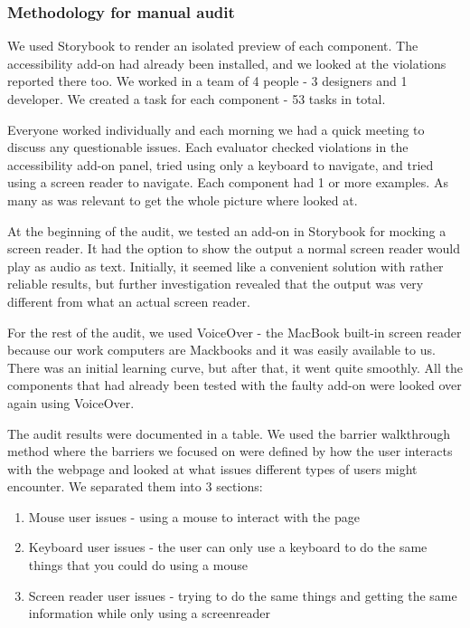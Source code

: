 \documentclass{master_thesis}
\begin{document}
\subsubsection{Methodology for manual audit}
We used Storybook to render an isolated preview of each component.
The accessibility add-on had already been installed, and we looked at the violations reported there too. We worked in a team of 4 people - 3 designers and 1 developer. We created a task for each component - 53 tasks in total.

Everyone worked individually and each morning we had a quick meeting to discuss any questionable issues. Each evaluator checked violations in the accessibility add-on panel, tried using only a keyboard to navigate, and tried using a screen reader to navigate. Each component had 1 or more examples. As many as was relevant to get the whole picture where looked at.

At the beginning of the audit, we tested an add-on in Storybook for mocking a screen reader\citep{Lara}. It had the option to show the output a normal screen reader would play as audio as text. Initially, it seemed like a convenient solution with rather reliable results, but further investigation revealed that the output was very different from what an actual screen reader.

For the rest of the audit, we used VoiceOver - the MacBook built-in screen reader because our work computers are Mackbooks and it was easily available to us. There was an initial learning curve, but after that, it went quite smoothly. All the components that had already been tested with the faulty add-on were looked over again using VoiceOver.

The audit results were documented in a table. We used the barrier walkthrough method where the barriers we focused on were defined by how the user interacts with the webpage and looked at what issues different types of users might encounter. We separated them into 3 sections:
\begin{enumerate}
	\item Mouse user issues - using a mouse to interact with the page
	\item Keyboard user issues - the user can only use a keyboard to do the same things that you could do using a mouse
	\item Screen reader user issues - trying to do the same things and getting the same information while only using a screenreader
\end{enumerate}
\end{document}
